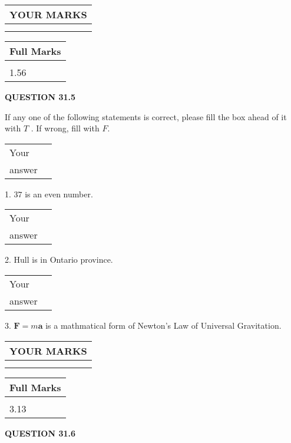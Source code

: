 \documentclass[12pt]{article}
\begin{document}
\vspace{0.2in}
  
\noindent\begin{tabular}{|l|}
\hline
 YOUR MARKS  \\
\hline
 \\ 
 \\ 
\hline
\end{tabular}
\hspace{0.05in} \begin{tabular}{|l|}
\hline
 Full Marks  \\
\hline
 \\ 
1.56 \\
\hline
\end{tabular}
{\textbf{\Large{QUESTION
31.5 
}}}
  
  
If any one of the following statements is correct, please fill the box ahead of it with $T$ .
If wrong, fill with $F$.
 
\noindent\begin{tabular}{|l|l|}\hline Your&\hspace{.2in} \\ answer&\hspace{.2in} \\ \hline \end{tabular}
1. $ %
37$ is an  %
even number.
 
\noindent\begin{tabular}{|l|l|}\hline Your&\hspace{.2in} \\ answer&\hspace{.2in} \\ \hline \end{tabular}
2.  %
Hull is in  %
Ontario province.
 
\noindent\begin{tabular}{|l|l|}\hline Your&\hspace{.2in} \\ answer&\hspace{.2in} \\ \hline \end{tabular}
3.  %
$\mathbf{F}=m\mathbf{a}$ is a mathmatical form of
Newton's Law of Universal Gravitation.
 

 
\vspace{0.3in}
  
\vspace{0.2in}
  
\noindent\begin{tabular}{|l|}
\hline
 YOUR MARKS  \\
\hline
 \\ 
 \\ 
\hline
\end{tabular}
\hspace{0.05in} \begin{tabular}{|l|}
\hline
 Full Marks  \\
\hline
 \\ 
3.13 \\
\hline
\end{tabular}
{\textbf{\Large{QUESTION
31.6 
}}}
  
\end{document}
